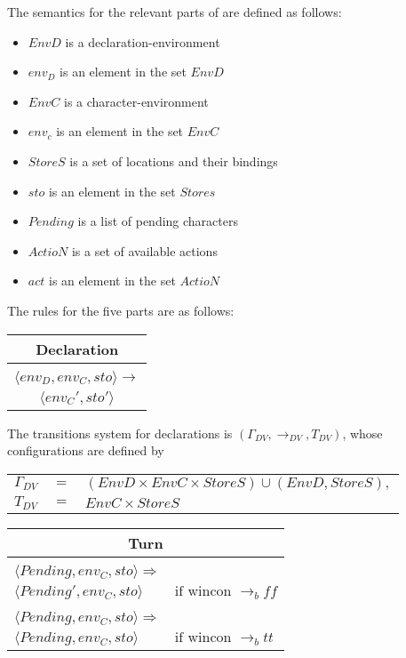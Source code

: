 The semantics for the relevant parts of \langname{} are defined as follows:
\begin{itemize}
	\item $EnvD$ is a declaration-environment
	\item $env_{D}$ is an element in the set $EnvD$
	\item $EnvC$ is a character-environment
	\item $env_{c}$ is an element in the set $EnvC$
	\item $StoreS$ is a set of locations and their bindings
	\item $sto$ is an element in the set $Stores$
	\item $Pending$ is a list of pending characters
	\item $ActioN$ is a set of available actions
	\item $act$ is an element in the set $ActioN$
\end{itemize}
\pagebreak
The rules for the five parts are as follows:
\begin{center}
\begin{tabular}{ c }
\textbf{Declaration}\\
\hline
 \\
$\langle env_{D}, env_{C}, sto \rangle \rightarrow$\\
$\langle env_{C}', sto' \rangle$\\
\end{tabular}
\end{center}
The transitions system for declarations is $(\Gamma_{DV}, \rightarrow_{DV}, T_{DV})$, whose configurations are defined by \\
\begin{tabular}{l l l}
$\Gamma_{DV}$ & $=$ & $(EnvD \times EnvC \times StoreS) \cup (EnvD, StoreS),$ \\
$T_{DV}$ & $=$ & $EnvC \times StoreS$ \\
\end{tabular}
\begin{center}
\begin{tabular}{ l l }
\multicolumn{2}{c}{\textbf{Turn}}\\
\hline
 & \\
$\langle Pending, env_{C}, sto \rangle \Rightarrow$ & \\
$\langle Pending', env_{C}, sto \rangle$ & $\text{if wincon } \rightarrow_{b} ff$\\
 & \\
$\langle Pending, env_{C}, sto \rangle \Rightarrow$ & \\
$\langle Pending, env_{C}, sto \rangle$ & $\text{if wincon } \rightarrow_{b} tt$\\
\end{tabular}
\end{center}

